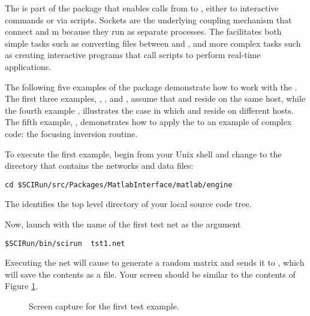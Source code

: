 
\ModuleRefSummary

The \mlm{} is part of the  package that enables
calls from \sr{} to \m{}, either to interactive commands or via \m{}
scripts.  Sockets are the underlying coupling mechanism that connect \sr{}
and m{} because they run as separate processes.  The \mlm{} facilitates
both simple tasks such as converting files between \sr{} and \m{}, and more
complex tasks such as creating interactive \sr{} programs that call \m{}
scripts to perform real-time applications.

\ModuleRefUse

The following five examples of the  package
demonstrate how to work with the \mlm{}.  The first three examples,
, , and , assume
that \sr{} and \m{} reside on the same host, while the fourth example
, illustrates the case in which \sr{} and \m{} reside on
different hosts. The fifth example, , demonstrates how
to apply the \mlm{} to an example of complex \m{} code: the focusing
inversion routine.



To execute the first example, begin from your Unix shell and change to the
directory that contains the networks and data files:
%
\begin{verbatim}
cd $SCIRun/src/Packages/MatlabInterface/matlab/engine
\end{verbatim}
%
The  identifies the top level directory of your 
local
\sr{} source code tree.

Now, launch \sr{} with the name of the first test net as the 
argument 
%
\begin{verbatim}
$SCIRun/bin/scirun  tst1.net
\end{verbatim}

Executing the net will cause \m{} to generate a random matrix and sends it
to \sr{}, which will save the contents as a \sr{} file.  Your screen should
be similar to the contents of Figure \ref{fig:tst1}.


\begin{figure}[htb]
  \begin{makeimage}
  \end{makeimage}
  \tstone
  \caption{\label{fig:tst1} Screen capture for the first test
  example.}
\end{figure}


